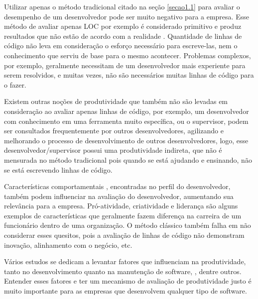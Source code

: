 Utilizar apenas o método tradicional citado na seção \ref{secao1.1} para avaliar o desempenho de um desenvolvedor pode ser muito negativo para a empresa. Esse método de avaliar apenas LOC por exemplo é considerado primitivo e produz resultados que não estão de acordo com a realidade \cite{Symons2010}. Quantidade de linhas de código não leva em consideração o esforço necessário para escreve-las, nem o conhecimento que serviu de base para o mesmo acontecer. Problemas complexos, por exemplo, geralmente necessitam de um desenvolvedor mais experiente para serem resolvidos, e muitas vezes, não são necessários muitas linhas de código para o fazer.

Existem outras noções de produtividade que também não são levadas em consideração ao avaliar apenas linhas de código, por exemplo, um desenvolvedor com conhecimento em uma ferramenta muito específica, ou o supervisor, podem ser consultados frequentemente por outros desenvolvedores, agilizando e melhorando o processo de desenvolvimento de outros desenvolvedores, logo, esse desenvolvedor/supervisor possui uma produtividade indireta, que não é mensurada no método tradicional pois quando se está ajudando e ensinando, não se está escrevendo linhas de código.

Características comportamentais , encontradas no perfil do desenvolvedor, também podem influenciar na avaliação do desenvolvedor, aumentando sua relevância para a empresa. Pró-atividade, criatividade e liderança são alguns exemplos de características que geralmente fazem diferença na carreira de um funcionário dentro de uma organização. O método clássico também falha em não considerar esses quesitos, pois a avaliação de linhas de código não demonstram inovação, alinhamento com o negócio, etc.

Vários estudos se dedicam a levantar fatores que influenciam na produtividade, tanto no desenvolvimento quanto na manutenção de software, \cite{deBarrosSampaio2010, Wagner2008, Calow1991, Vosburgh1984}, dentre outros. Entender esses fatores e ter um mecanismo de avaliação de produtividade justo é muito importante para as empresas que desenvolvem qualquer tipo de software.

